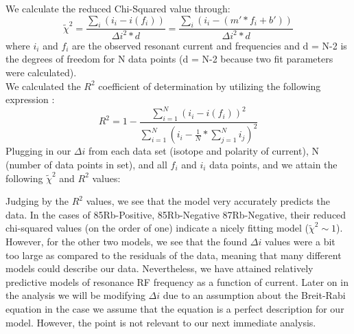 \documentclass{article}
\begin{document}
\indent We calculate the reduced Chi-Squared value through:
\begin{equation}
        \tilde{\chi}^2 = \frac{\sum_i (i_i - i(f_i))}{\Delta i^2*d} = \frac{\sum_i (i_i - (m'*f_i + b'))}{\Delta i^2*d}
\end{equation}
where $i_i$ and $f_i$ are the observed resonant current and frequencies and d = N-2 is the degrees of freedom for N data points (d = N-2 because two fit parameters were calculated). 
\\\indent We calculated the $R^2$ coefficient of determination by utilizing the following expression \cite{rsq}:
\begin{equation}
        R^2 = 1- \frac{\sum_{i=1}^N (i_i - i(f_i))^2}{\sum_{i=1}^N (i_i - \frac{1}{N}*\sum_{j=1}^N i_j)^2}
\end{equation}   
Plugging in our $\Delta i$ from each data set (isotope and polarity of current), N (number of data points in set), and all $f_i$ and $i_i$ data points, and we attain the following $\tilde{\chi}^2$ and $R^2$ values:
\begin{table}[H]
\centering
\caption{$\tilde{\chi}^2$ and $R^2$ for Best Fit Lines}
\label{my-label}
\end{table}
Judging by the $R^2$ values, we see that the model very accurately predicts the data. In the cases of 85Rb-Positive, 85Rb-Negative 87Rb-Negative, their reduced chi-squared values (on the order of one) indicate a nicely fitting model ($\tilde{\chi}^2 \sim 1$). However, for the other two models, we see that the found $\Delta i$ values were a bit too large as compared to the residuals of the data, meaning that many different models could describe our data. Nevertheless, we have attained relatively predictive models of resonance RF frequency as a function of current. Later on in the analysis we will be modifying $\Delta i$ due to an assumption about the Breit-Rabi equation in the case we assume that the equation is a perfect description for our model. However, the point is not relevant to our next immediate analysis.
\end{document}
